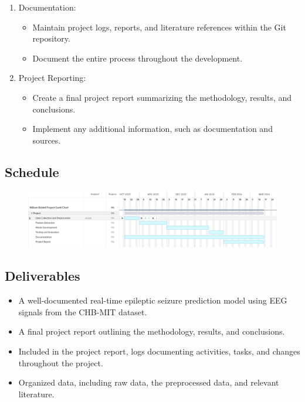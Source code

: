 \documentclass[12pt]{article}
\begin{document}
\begin{enumerate}
    \item Documentation:
    \begin{itemize}
        \item Maintain project logs, reports, and literature references within the Git repository.
        \item Document the entire process throughout the development.
    \end{itemize}
    
    \item Project Reporting:
    \begin{itemize}
        \item Create a final project report summarizing the methodology, results, and conclusions.
        \item Implement any additional information, such as documentation and sources.
    \end{itemize}
\end{enumerate}


\subsection{Schedule}

\begin{figure}[H]
\includegraphics[width=\textwidth]{gantt}
\centering
\end{figure}


\subsection{Deliverables}

\begin{itemize}
    \item A well-documented real-time epileptic seizure prediction model using EEG signals from the CHB-MIT dataset.
    \item A final project report outlining the methodology, results, and conclusions.
    \item Included in the project report, logs documenting activities, tasks, and changes throughout the project.
    \item Organized data, including raw data, the preprocessed data, and relevant literature.
\end{itemize}



\pagebreak

\printglossary[type=\acronymtype]
\printglossary

\pagebreak



\end{document}
